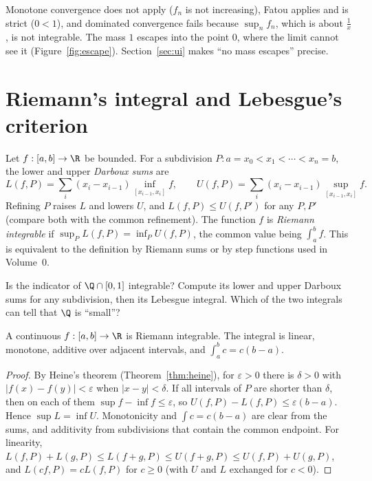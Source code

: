 Monotone convergence does not apply ($f_n$ is not increasing), Fatou applies and is strict ($0<1$), and dominated convergence fails because $\sup_nf_n$, which is about
$\frac1x$, is not integrable. The mass $1$ escapes into the point $0$, where the limit cannot see it (Figure~\ref{fig:escape}). Section~\ref{sec:ui} makes ``no mass escapes'' precise.

\section{Riemann's integral and Lebesgue's criterion}

Let $f:[a,b]\to\R$ be bounded. For a subdivision $P:a=x_0<x_1<\cdots<x_n=b$, the lower and upper \emph{Darboux sums} are
\[L(f,P)=\sum_i(x_i-x_{i-1})\inf_{[x_{i-1},x_i]}f,\qquad U(f,P)=\sum_i(x_i-x_{i-1})\sup_{[x_{i-1},x_i]}f.\]
Refining $P$ raises $L$ and lowers $U$, and $L(f,P)\le U(f,P')$ for any $P,P'$ (compare both with the common refinement). The function $f$ is \emph{Riemann integrable} if
$\sup_PL(f,P)=\inf_PU(f,P)$, the common value being $\int_a^bf$. This is equivalent to the definition by Riemann sums or by step functions used in Volume~0.

\begin{think}
Is the indicator of $\Q\cap[0,1]$ integrable? Compute its lower and upper Darboux sums for any subdivision, then its Lebesgue integral. Which of the two integrals
can tell that $\Q$ is ``small''?
\end{think}

\begin{theorem}\label{thm:riemanncont}
A continuous $f:[a,b]\to\R$ is Riemann integrable. The integral is linear, monotone, additive over adjacent intervals, and $\int_a^bc=c(b-a)$.
\end{theorem}
\begin{proof}
By Heine's theorem (Theorem~\ref{thm:heine}), for $\varepsilon>0$ there is $\delta>0$ with $|f(x)-f(y)|<\varepsilon$ when $|x-y|<\delta$. If all intervals of $P$ are shorter than $\delta$, then on each of them
$\sup f-\inf f\le\varepsilon$, so $U(f,P)-L(f,P)\le\varepsilon(b-a)$. Hence $\sup L=\inf U$. Monotonicity and $\int c=c(b-a)$ are clear from the sums, and additivity from subdivisions that contain the
common endpoint. For linearity, $L(f,P)+L(g,P)\le L(f+g,P)\le U(f+g,P)\le U(f,P)+U(g,P)$, and $L(cf,P)=cL(f,P)$ for $c\ge0$ (with $U$ and $L$ exchanged for $c<0$).
\end{proof}

